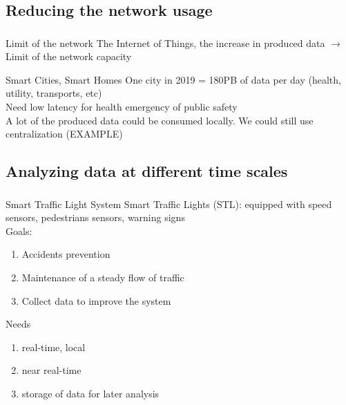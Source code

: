 \documentclass[utf8,xcolor=table, page number]{earlywinter}
\begin{document}
\subsection{Reducing the network usage}
\begin{frame}
  \frametitle{\secname}
  \framesubtitle{\subsecname}

  \begin{alertblock}{Limit of the network}
    The Internet of Things, the increase in produced data $\to$ Limit of the network capacity
  \end{alertblock}

  \begin{exampleblock}{Smart Cities, Smart Homes}
    One city in 2019 = 180PB of data per day (health, utility, transports, etc)\\
    Need low latency for health emergency of public safety \\
    A lot of the produced data could be consumed locally. We could still use centralization (EXAMPLE)
  \end{exampleblock}
  
\end{frame}


\subsection{Analyzing data at different time scales}
\begin{frame}
  \frametitle{\secname}
  \framesubtitle{\subsecname}

  \begin{exampleblock}{Smart Traffic Light System}
    Smart Traffic Lights (STL): equipped with speed sensors, pedestrians sensors, warning signs\\
    Goals:
    \begin{enumerate}
      \item Accidents prevention
      \item Maintenance of a steady flow of traffic
      \item Collect data to improve the system
    \end{enumerate}
  \end{exampleblock}
  
  \begin{block}{Needs}
    \begin{enumerate}
      \item real-time, local
      \item near real-time
      \item storage of data for later analysis
    \end{enumerate}
  \end{block}
  
\end{frame}
\end{document}
